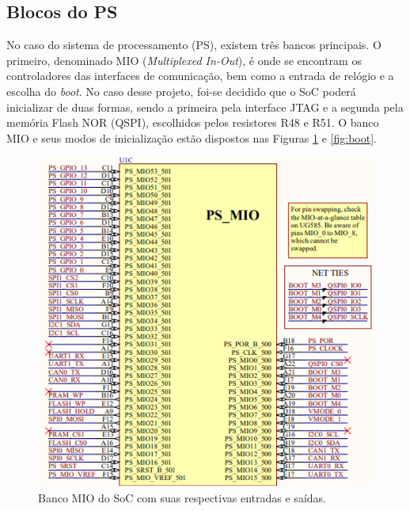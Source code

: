 \subsection{Blocos do PS}

No caso do sistema de processamento (PS), existem três bancos principais. O primeiro, denominado MIO (\textit{Multiplexed In-Out}), é onde se encontram os controladores das interfaces de comunicação, bem como a entrada de relógio e a escolha do \textit{boot}. No caso desse projeto, foi-se decidido que o SoC poderá inicializar de duas formas, sendo a primeira pela interface JTAG e a segunda pela memória Flash NOR (QSPI), escolhidos pelos resistores R48 e R51. O banco MIO e seus modos de inicialização estão dispostos nas Figuras \ref{fig:psmio} e \ref{fig:boot}.

\begin{figure}[H]
    \centering
    \includegraphics[scale=0.8]{images/psmio.png}
    \caption{Banco MIO do SoC com suas respectivas entradas e saídas.}
    \label{fig:psmio}
\end{figure}

